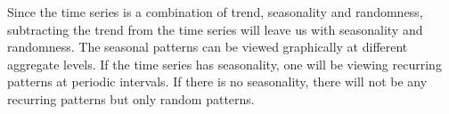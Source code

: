 Since the time series is a combination of trend, seasonality and randomness, subtracting the trend from the time series will leave us with seasonality and randomness. The seasonal patterns can be viewed graphically at different aggregate levels. If the time series has
seasonality, one will be viewing recurring patterns at periodic intervals. If there is no seasonality, there will not be any recurring patterns but only random patterns.

